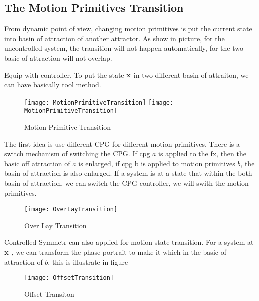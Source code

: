 \subsection{The Motion Primitives Transition}

From dynamic point of view, changing motion primitives is put the current state into basin of attraction of another attractor.
As show in picture, for the uncontrolled system, the transition will not happen automatically, for the two basic of attraction will not overlap.

Equip with controller,
To put the state $\mathbf{x}$ in two different basin of attraiton, we can have basically tool method.


\begin{figure}[!htbp]
  \begin{center}
    \leavevmode
    \ifpdf
      \texttt{[image: MotionPrimitiveTransition]}
    \else
      \texttt{[image: MotionPrimitiveTransition]}
    \fi
    \caption{Motion Primitive Transition}
    \label{fig:motion-transition}
  \end{center}
\end{figure}

\begin{itemize}
The first idea is use different CPG for different motion primitives. 
There is a switch mechanism of switching the CPG.
If cpg $a$ is applied to the fx, then the basic off attraction of $a$ is enlarged, if cpg b is applied to motion primitives $b$,
the basin of attraction is also enlarged.
If a system is at a state that within the both basin of attraction, we can switch the CPG controller, we will swith the motion primitives.


\begin{figure}[!htbp]
  \begin{center}
      \texttt{[image: OverLayTransition]}
    \caption{Over Lay Transition}
    \label{fig:motion-transition}
  \end{center}
\end{figure}


Controlled Symmetr can also applied for motion state transition.
For a system at $\mathbf{x}$ , we can transform the phase portrait to make it which in the basic of attraction of $b$,
this is illustrate in figure 


\begin{figure}[!htbp]
  \begin{center}
      \texttt{[image: OffsetTransition]}
    \caption{Offset Transiton}
    \label{fig:transform-transit}
  \end{center}
\end{figure}
\end{itemize}




